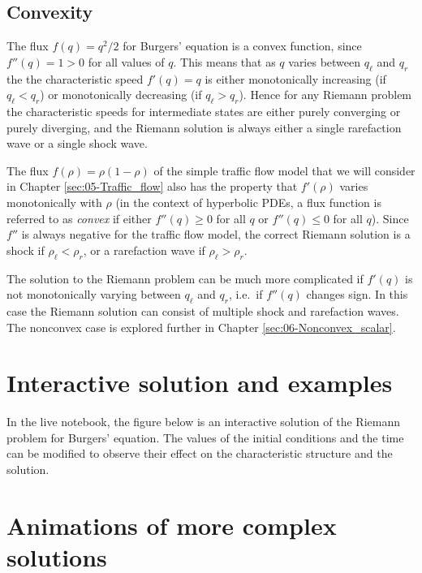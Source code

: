 \documentclass{SIAMbook2016}
\begin{document}
\hypertarget{convexity}{%
\subsection{Convexity}\label{convexity}}

The flux \(f(q) = q^2/2\) for Burgers' equation is a convex function,
since \(f''(q) = 1 > 0\) for all values of \(q\). This means that as
\(q\) varies between \(q_\ell\) and \(q_r\) the the characteristic speed
\(f'(q) = q\) is either monotonically increasing (if \(q_\ell < q_r\))
or monotonically decreasing (if \(q_\ell > q_r\)). Hence for any Riemann
problem the characteristic speeds for intermediate states are either
purely converging or purely diverging, and the Riemann solution is
always either a single rarefaction wave or a single shock wave.

The flux \(f(\rho) = \rho(1-\rho)\) of the simple traffic flow model
that we will consider in Chapter \ref{sec:05-Traffic_flow} also has the
property that \(f'(\rho)\) varies monotonically with \(\rho\) (in the
context of hyperbolic PDEs, a flux function is referred to as
\emph{convex} if either \(f''(q)\ge0\) for all \(q\) or \(f''(q)\le 0\)
for all \(q\)). Since \(f''\) is always negative for the traffic flow
model, the correct Riemann solution is a shock if
\(\rho_\ell < \rho_r\), or a rarefaction wave if \(\rho_\ell > \rho_r\).

The solution to the Riemann problem can be much more complicated if
\(f'(q)\) is not monotonically varying between \(q_\ell\) and \(q_r\),
i.e.~if \(f''(q)\) changes sign. In this case the Riemann solution can
consist of multiple shock and rarefaction waves. The nonconvex case is
explored further in Chapter \ref{sec:06-Nonconvex_scalar}.

\hypertarget{interactive-solution-and-examples}{%
\section{Interactive solution and
examples}\label{interactive-solution-and-examples}}

In the live notebook, the figure below is an interactive solution of the
Riemann problem for Burgers' equation. The values of the initial
conditions and the time can be modified to observe their effect on the
characteristic structure and the solution.

\hypertarget{animations-of-more-complex-solutions}{%
\section{Animations of more complex
solutions}\label{animations-of-more-complex-solutions}}
\end{document}
